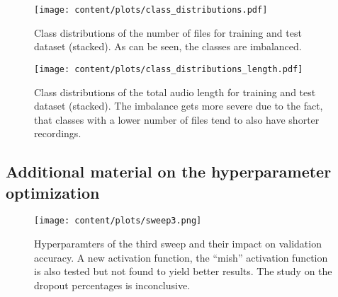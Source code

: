 \begin{figure}
    \centering
    \texttt{[image: content/plots/class\_distributions.pdf]}
    \caption{Class distributions of the number of files for training and test dataset (stacked). As can be seen, the classes are imbalanced.}
    \label{fig:class_distributions}
\end{figure}

\begin{figure}
    \centering
    \texttt{[image: content/plots/class\_distributions\_length.pdf]}
    \caption{Class distributions of the total audio length for training and test dataset (stacked). The imbalance gets more severe due to the fact, that classes with a lower 
    number of files tend to also have shorter recordings.}
    \label{fig:class_distributions_length}
\end{figure}

\subsection{Additional material on the hyperparameter optimization}
\label{sec:Appendix3}

\begin{figure}
    \centering 
    \texttt{[image: content/plots/sweep3.png]}
    \caption{Hyperparamters of the third sweep and their impact on validation accuracy. A new activation function, the \enquote{mish} activation function is also tested but not found 
    to yield better results. The study on the dropout percentages is inconclusive.}
    \label{fig:sweep3}
\end{figure}

\newpage

